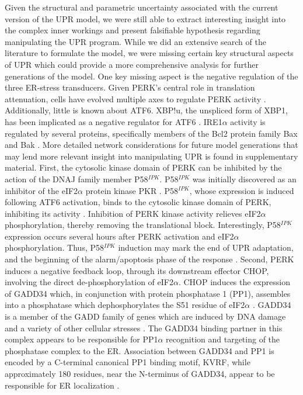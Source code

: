 \documentclass[fleqn,10pt]{wlscirep}
\begin{document}
Given the structural and parametric uncertainty associated with the current version of the UPR model, we were still able to extract interesting insight into the complex inner workings and present falsifiable hypothesis regarding manipulating the UPR program.
While we did an extensive search of the literature to formulate the model, we were missing certain key structural aspects of UPR which could provide a more comprehensive analysis for further generations of the model.
One key missing aspect is the negative regulation of the three ER-stress transducers. Given PERK's central role in translation attenuation, cells have evolved multiple axes to regulate PERK activity \cite{Lee:1990ye}.
Additionally, little is known about ATF6. XBP!u, the unspliced form of XBP1, has been implicated as a negative regulator for ATF6 \cite{Yoshida:2009bs}.
IRE1$\alpha$ activity is regulated by several proteins, specifically members of the Bcl2 protein family Bax and Bak \cite{Hetz:2006qf}.
More detailed network considerations for future model generations that may lend more relevant insight into manipulating UPR is found in supplementary material.
First, the cytosolic kinase domain of PERK can be inhibited by the action of the DNAJ family member P58$^{IPK}$.
P58$^{IPK}$ was initially discovered as an inhibitor of the eIF2$\alpha$ protein kinase PKR \cite{Lee:1990ye}.
P58$^{IPK}$, whose expression is induced following ATF6 activation, binds to the cytosolic kinase domain of PERK, inhibiting its activity \cite{Yan:2002fk,Huizen:2003qo}.
Inhibition of PERK kinase activity relieves eIF2$\alpha$ phosphorylation, thereby removing the translational block. Interestingly, P58$^{IPK}$ expression occurs several hours after PERK activation and eIF2$\alpha$ phosphorylation.
Thus, P58$^{IPK}$ induction may mark the end of UPR adaptation, and the beginning of the alarm/apoptosis phase of the response \cite{szegezdi2006mediators}.
Second, PERK induces a negative feedback loop, through its downstream effector CHOP, involving the direct de-phosphorylation of eIF2$\alpha$.
CHOP induces the expression of GADD34 which, in conjunction with protein phosphatase 1 (PP1), assembles into a phosphatase which dephosphorylates the S51 residue of eIF2$\alpha$ \cite{Novoa:2001mb}.
GADD34 is a member of the GADD family of genes which are induced by DNA damage and a variety of other cellular stresses \cite{Zhan:1994cq}.
The GADD34 binding partner in this complex appears to be responsible for PP1$\alpha$ recognition and targeting of the phosphatase complex to the ER. Association between GADD34 and PP1 is encoded by a C-terminal canonical PP1 binding motif, KVRF, while approximately 180 residues, near the N-terminus of GADD34, appear to be responsible for ER localization \cite{Brush:2003kh}.
\end{document}
